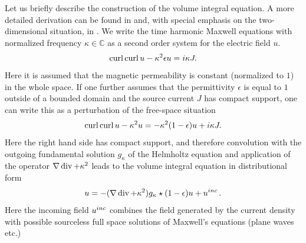 \documentclass[12pt]{amsart}
\theoremstyle{definition}
\theoremstyle{remark}
\numberwithin{equation}{section}
\renewcommand{\div}{\operatorname{\rm div}}
\newcommand{\curl}{\operatorname{\rm curl}}
\newcommand\C{{\mathbb C}}
\begin{document}
Let us briefly describe the construction of the volume integral equation.
A more detailed derivation can be found in \cite{Kirsch2007} and, with special emphasis on the two-dimensional situation, in \cite{CoDarSak2015}.  
We write the time harmonic Maxwell equations with normalized frequency $\kappa\in\C$ as a second order system for the electric field $u$.
\begin{equation}
\label{E:Maxwell}
\curl\curl u -\kappa^{2}\epsilon u= i\kappa J.
\end{equation}
Here it is assumed that the magnetic permeability is constant (normalized to $1$) in the whole space. If one further assumes that the permittivity $\epsilon$ is equal to $1$ outside of a bounded domain and the source current $J$ has compact support, one can write this as a perturbation of the free-space situation
\begin{equation}
\label{E:Maxwellpert}
\curl\curl u -\kappa^{2} u= -\kappa^{2}(1-\epsilon) u + i\kappa J.
\end{equation}
Here the right hand side has compact support, and therefore convolution with the outgoing fundamental solution $g_{\kappa}$ of the Helmholtz equation and application of the operator 
$\nabla\div + \kappa^{2}$ leads to the volume integral equation in distributional form
\begin{equation}
\label{E:VIEdist}
 u = -(\nabla\div + \kappa^{2})g_{\kappa}\star(1-\epsilon)u + u^{\rm inc} \,.
\end{equation}
Here the incoming field $u^{\rm inc}$ combines the field generated by the current density with possible sourceless full space solutions of Maxwell's equations (plane waves etc.) 
\end{document}
